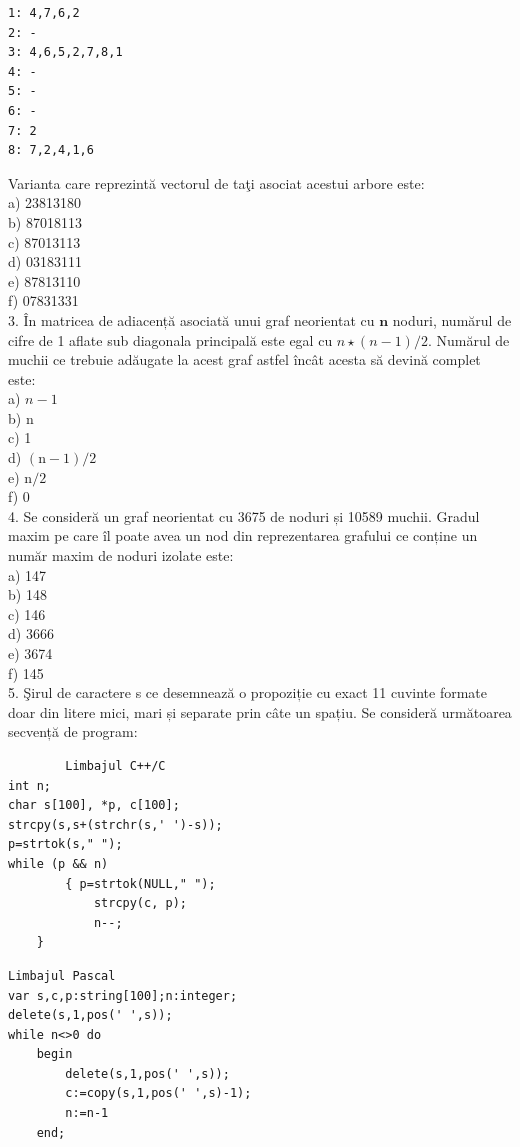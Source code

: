 \documentclass[10pt]{article}
\begin{document}
\begin{verbatim}
1: 4,7,6,2
2: -
3: 4,6,5,2,7,8,1
4: -
5: -
6: -
7: 2
8: 7,2,4,1,6
\end{verbatim}

Varianta care reprezintă vectorul de taţi asociat acestui arbore este:\\
a) 23813180\\
b) 87018113\\
c) 87013113\\
d) 03183111\\
e) 87813110\\
f) 07831331\\
3. În matricea de adiacență asociată unui graf neorientat cu $\mathbf{n}$ noduri, numărul de cifre de 1 aflate sub diagonala principală este egal cu $n \star(n-1) / 2$. Numărul de muchii ce trebuie adăugate la acest graf astfel încât acesta să devină complet este:\\
a) $n-1$\\
b) n\\
c) 1\\
d) $(\mathrm{n}-1) / 2$\\
e) $\mathrm{n} / 2$\\
f) 0\\
4. Se consideră un graf neorientat cu 3675 de noduri și 10589 muchii. Gradul maxim pe care îl poate avea un nod din reprezentarea grafului ce conține un număr maxim de noduri izolate este:\\
a) 147\\
b) 148\\
c) 146\\
d) 3666\\
e) 3674\\
f) 145\\
5. Şirul de caractere s ce desemnează o propoziție cu exact 11 cuvinte formate doar din litere mici, mari și separate prin câte un spațiu. Se consideră următoarea secvență de program:

\begin{verbatim}
        Limbajul C++/C
int n;
char s[100], *p, c[100];
strcpy(s,s+(strchr(s,' ')-s));
p=strtok(s," ");
while (p && n)
        { p=strtok(NULL," ");
            strcpy(c, p);
            n--;
    }
\end{verbatim}

\begin{verbatim}
Limbajul Pascal
var s,c,p:string[100];n:integer;
delete(s,1,pos(' ',s));
while n<>0 do
    begin
        delete(s,1,pos(' ',s));
        c:=copy(s,1,pos(' ',s)-1);
        n:=n-1
    end;
\end{verbatim}
\end{document}

